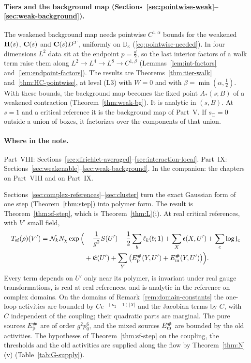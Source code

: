 \paragraph{Tiers and the background map (Sections~\ref{sec:pointwise-weak}--\ref{sec:weak-background}).} The weakened background map needs pointwise $C^{1,\alpha}$ bounds for the weakened $\mathbf H(s)$, $\mathbf C(s)$ and $\mathbf C(s)D^T$, uniformly on $\mathbb D_\kappa$ (\eqref{eq:pointwise-needed}). In four dimensions $L^2$ data sit at the endpoint $p=\frac d2$, so the last interior factors of a walk term raise them along $L^2\to L^4\to L^8\to C^{1,\beta}$ (Lemmas~\ref{lem:int-factors} and~\ref{lem:endpoint-factors}). The results are Theorems~\ref{thm:tier-walk} and~\ref{thm:HC-pointwise}, at level (L3) with $W=0$ and with $\beta=\min(\alpha,\frac12)$. With these bounds, the background map becomes the fixed point $A_*(s;B)$ of a weakened contraction (Theorem~\ref{thm:weak-bg}). It is analytic in $(s,B)$. At $s=1$ and a critical reference it is the background map of Part~V. If $s_\Box=0$ outside a union of boxes, it factorizes over the components of that union.

\paragraph{Where in the note.} Part~VIII: Sections~\ref{sec:dirichlet-averaged}--\ref{sec:interaction-local}. Part~IX: Sections~\ref{sec:weakenable}--\ref{sec:weak-background}. In the companion: the chapters on Part~VIII and on Part~IX.

\label{g:polymer}

Sections~\ref{sec:complex-references}--\ref{sec:cluster} turn the exact Gaussian form of one step (Theorem~\ref{thm:step}) into polymer form. The result is Theorem~\ref{thm:sf-step}, which is Theorem~\ref{thm:L}(i). At real critical references, with $V'$ small field,
\[
\begin{aligned}
T_{\rm sf}(\rho)(V')=\mathcal N_kN_\chi\exp\Big(&-\frac1{g^2}S(U')-\frac12\sum_b\ell_k(b;1)+\sum_X\mathfrak e(X,U')+\sum_c\log\mathfrak j_c\\
&+\mathfrak E(U')+\sum_Y\big(E^\#_{\rm p}(Y,U')+E^\#_{\rm m}(Y,U')\big)\Big).
\end{aligned}
\]
Every term depends on $U'$ only near its polymer, is invariant under real gauge transformations, is real at real references, and is analytic in the reference on complex domains. On the domains of Remark~\ref{rem:domain-constants} the one-loop activities are bounded by $Ce^{-(\kappa_2-1)|X|}$ and the Jacobian terms by $C$, with $C$ independent of the coupling; their quadratic parts are marginal. The pure sources $E^\#_{\rm p}$ are of order $g^2p_0^6$, and the mixed sources $E^\#_{\rm m}$ are bounded by the old activities. The hypotheses of Theorem~\ref{thm:sf-step} on the coupling, the thresholds and the old activities are supplied along the flow by Theorem~\ref{thm:N}(v) (Table~\ref{tab:G-supply}).


